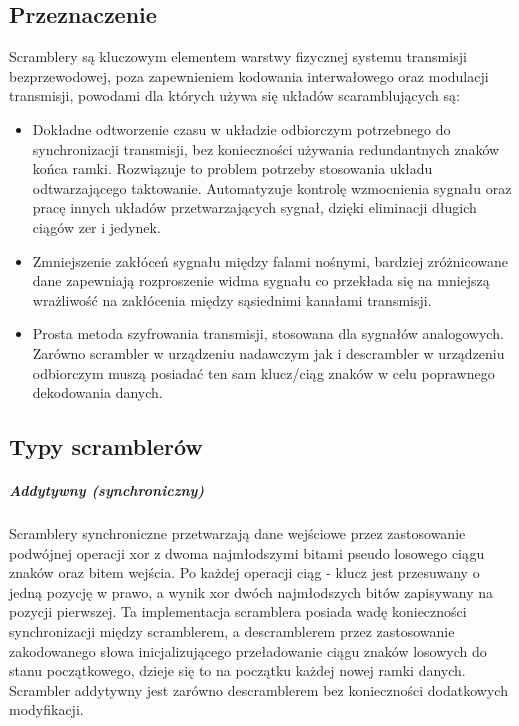 \documentclass[polish, 11pt]{article}
\begin{document}
    \subsection{Przeznaczenie}
	    Scramblery są kluczowym elementem warstwy fizycznej systemu transmisji bezprzewodowej, poza zapewnieniem
	    kodowania interwałowego oraz modulacji transmisji, powodami dla których używa się układów scaramblujących są:
	    \begin{itemize}
	    	\item Dokładne odtworzenie czasu w układzie odbiorczym potrzebnego do synchronizacji transmisji,
	    	bez konieczności używania redundantnych znaków końca ramki. Rozwiązuje to problem potrzeby stosowania
	    	układu odtwarzającego taktowanie. Automatyzuje kontrolę wzmocnienia sygnału oraz pracę innych układów
	    	przetwarzających sygnał, dzięki eliminacji długich ciągów zer i jedynek.
	    	\item Zmniejszenie zakłóceń sygnału między falami nośnymi, bardziej zróżnicowane dane zapewniają
	    	rozproszenie widma sygnału co przekłada się na mniejszą wrażliwość na zakłócenia między sąsiednimi
	    	kanałami transmisji.
	    	\item Prosta metoda szyfrowania transmisji, stosowana dla sygnałów analogowych. Zarówno scrambler
	    	w urządzeniu nadawczym jak i descrambler w urządzeniu odbiorczym muszą posiadać ten sam klucz/ciąg
	    	znaków w celu poprawnego dekodowania danych.
	    \end{itemize}
	    
    \subsection{Typy scramblerów}
	    \subparagraph{Addytywny (synchroniczny)\\}
		    Scramblery synchroniczne przetwarzają dane wejściowe przez zastosowanie podwójnej operacji xor z dwoma najmłodszymi
		    bitami pseudo losowego ciągu znaków oraz bitem wejścia. Po każdej operacji ciąg - klucz jest przesuwany o jedną
		    pozycję w prawo, a wynik xor dwóch najmłodszych bitów zapisywany na pozycji pierwszej. Ta implementacja scramblera
		    posiada wadę konieczności synchronizacji między scramblerem, a descramblerem przez zastosowanie zakodowanego słowa
		    inicjalizującego przeładowanie ciągu znaków losowych do stanu początkowego, dzieje się to na początku każdej nowej ramki
		    danych. Scrambler addytywny jest zarówno descramblerem bez konieczności dodatkowych modyfikacji. 
		    
\end{document}
